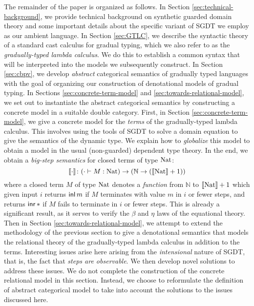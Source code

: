 
The remainder of the paper is organized as follows. In Section
\ref{sec:technical-background}, we provide technical background on synthetic
guarded domain theory and some important details about the specific variant of
SGDT we employ as our ambient language.
%
In Section \ref{sec:GTLC}, we describe the syntactic theory of a standard cast
calculus for gradual typing, which we also refer to as the \emph{gradually-typed
lambda calculus}. We do this to establish a common syntax that will be
interpreted into the models we subsequently construct.
%
In Section \ref{sec:cbpv}, we develop \emph{abstract} categorical
semantics of gradually typed languages with the goal of organizing our
construction of denotational models of gradual typing.
%
In Sections \ref{sec:concrete-term-model} and
\ref{sec:towards-relational-model}, we set out to instantiate the abstract
categorical semantics by constructing a concrete model in a suitable double
category. First, in Section \ref{sec:concrete-term-model}, we give a concrete
model for the \emph{terms} of the gradually-typed lambda calculus. This involves
using the tools of SGDT to solve a domain equation to give the semantics of the
dynamic type. We explain how to \emph{globalize} this model to obtain a model in
the usual (non-guarded) dependent type theory. In the end, we obtain a
\emph{big-step semantics} for closed terms of type $\text{Nat}$:
%
\[ \llbracket {\cdot} \rrbracket \colon (\cdot \vdash M : \text{Nat}) \to (\mathbb{N} \to (\llbracket {\text{Nat}} \rrbracket + 1)) \] 
%
where a closed term $M$ of type $\text{Nat}$ denotes a \emph{function} from
$\mathbb{N}$ to $\llbracket {\text{Nat}} \rrbracket + 1$ which given input $i$ returns $\mathsf{inl}\, m$ if $M$
terminates with value $m$ in $i$ or fewer steps, and returns $\mathsf{inr}\, *$ if $M$
fails to terminate in $i$ or fewer steps. This is already a significant result,
as it serves to verify the $\beta$ and $\eta$ laws of the equational theory.
%
Then in Section \ref{sec:towards-relational-model}, we attempt to extend the
methodology of the previous section to give a denotational semantics that models
the relational theory of the gradually-typed lambda calculus in addition to the
terms. Interesting issues arise here arising from the \emph{intensional} nature
of SGDT, that is, the fact that \emph{steps are observable}. We then develop
novel solutions to address these issues. We do not complete the construction of
the concrete relational model in this section. Instead, we choose to reformulate
the definition of abstract categorical model to take into account the solutions
to the issues discussed here.


